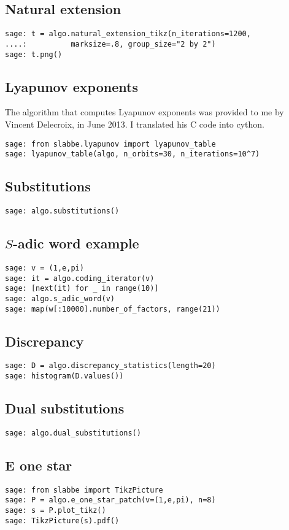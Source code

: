 \subsection{Natural extension}
\begin{verbatim}
sage: t = algo.natural_extension_tikz(n_iterations=1200, 
....:          marksize=.8, group_size="2 by 2")
sage: t.png()
\end{verbatim}
\subsection{Lyapunov exponents}
The algorithm that computes Lyapunov exponents was provided to me
by Vincent Delecroix, in June 2013. I translated his C code into cython.
\begin{verbatim}
sage: from slabbe.lyapunov import lyapunov_table
sage: lyapunov_table(algo, n_orbits=30, n_iterations=10^7)
\end{verbatim}
\subsection{Substitutions}
\begin{verbatim}
sage: algo.substitutions()
\end{verbatim}
\subsection{$S$-adic word example}
\begin{verbatim}
sage: v = (1,e,pi)
sage: it = algo.coding_iterator(v)
sage: [next(it) for _ in range(10)]
sage: algo.s_adic_word(v)
sage: map(w[:10000].number_of_factors, range(21))  
\end{verbatim}
\subsection{Discrepancy}
\begin{verbatim}
sage: D = algo.discrepancy_statistics(length=20)
sage: histogram(D.values())
\end{verbatim}
\subsection{Dual substitutions}
\begin{verbatim}
sage: algo.dual_substitutions()
\end{verbatim}
\subsection{E one star}
\begin{verbatim}
sage: from slabbe import TikzPicture
sage: P = algo.e_one_star_patch(v=(1,e,pi), n=8)
sage: s = P.plot_tikz()
sage: TikzPicture(s).pdf()
\end{verbatim}
